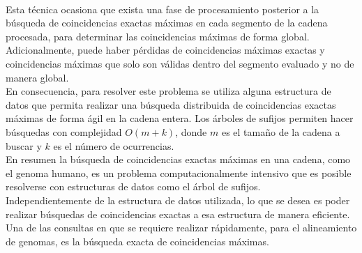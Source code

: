 \documentclass[12pt,a4paper]{article}
\begin{document}
\\Esta técnica ocasiona que exista una fase de procesamiento posterior a la búsqueda de 
coincidencias exactas máximas en cada segmento de la cadena procesada, para determinar
las coincidencias máximas de forma global. Adicionalmente, puede haber pérdidas de 
coincidencias máximas exactas y coincidencias máximas que solo son válidas dentro del 
segmento evaluado y no de manera global.\\
En consecuencia, para resolver este problema se utiliza alguna estructura de datos que 
permita realizar una búsqueda distribuida de coincidencias exactas máximas de forma ágil 
en la cadena entera. Los árboles de sufijos permiten hacer 
búsquedas con complejidad $O(m+k)$, donde $m$ es el 
tamaño de la cadena a buscar y $k$ es el número de ocurrencias.\\
En resumen la búsqueda de coincidencias exactas máximas en una cadena, como el 
genoma humano, es un problema computacionalmente intensivo que es posible 
resolverse con estructuras de datos como el árbol de sufijos. 
\\Independientemente de la estructura de datos utilizada, lo que se desea es poder
realizar búsquedas de coincidencias exactas a esa estructura de manera eficiente. 
Una de las consultas en que se requiere realizar rápidamente, para el alineamiento 
de genomas, es la búsqueda exacta de coincidencias máximas. 
\end{document}
